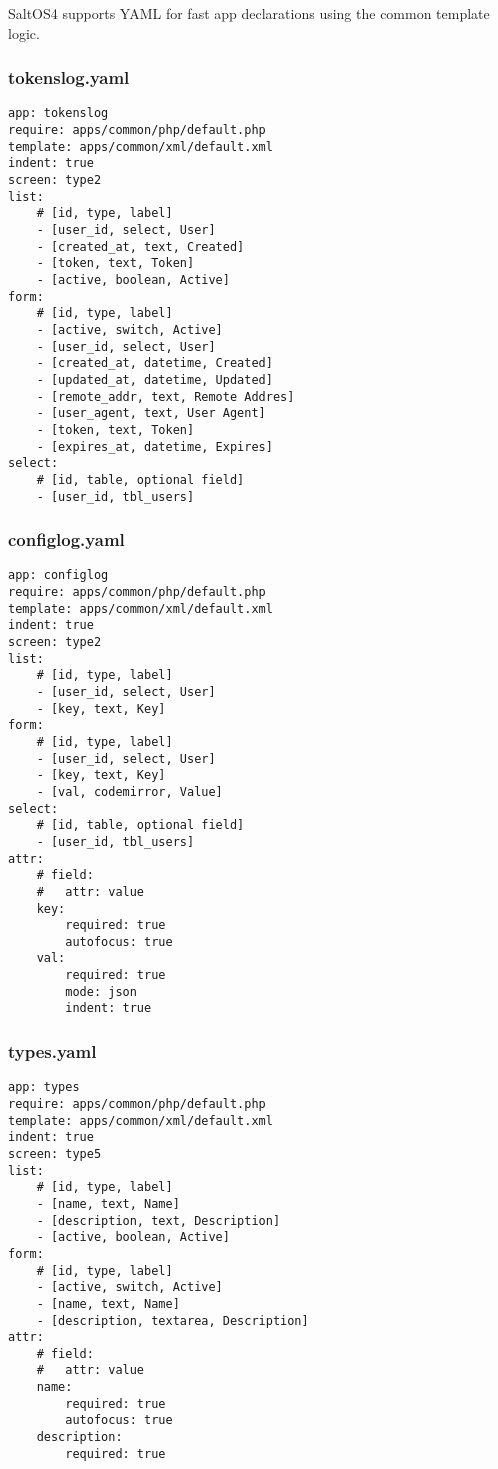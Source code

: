 \documentclass[a4paper]{article}
\begin{document}
SaltOS4 supports YAML for fast app declarations using the common template logic.

\hypertarget{toc15}{}
\subsubsection{tokenslog.yaml}

\begin{lstlisting}
app: tokenslog
require: apps/common/php/default.php
template: apps/common/xml/default.xml
indent: true
screen: type2
list:
    # [id, type, label]
    - [user_id, select, User]
    - [created_at, text, Created]
    - [token, text, Token]
    - [active, boolean, Active]
form:
    # [id, type, label]
    - [active, switch, Active]
    - [user_id, select, User]
    - [created_at, datetime, Created]
    - [updated_at, datetime, Updated]
    - [remote_addr, text, Remote Addres]
    - [user_agent, text, User Agent]
    - [token, text, Token]
    - [expires_at, datetime, Expires]
select:
    # [id, table, optional field]
    - [user_id, tbl_users]
\end{lstlisting}

\hypertarget{toc16}{}
\subsubsection{configlog.yaml}

\begin{lstlisting}
app: configlog
require: apps/common/php/default.php
template: apps/common/xml/default.xml
indent: true
screen: type2
list:
    # [id, type, label]
    - [user_id, select, User]
    - [key, text, Key]
form:
    # [id, type, label]
    - [user_id, select, User]
    - [key, text, Key]
    - [val, codemirror, Value]
select:
    # [id, table, optional field]
    - [user_id, tbl_users]
attr:
    # field:
    #   attr: value
    key:
        required: true
        autofocus: true
    val:
        required: true
        mode: json
        indent: true
\end{lstlisting}

\hypertarget{toc17}{}
\subsubsection{types.yaml}

\begin{lstlisting}
app: types
require: apps/common/php/default.php
template: apps/common/xml/default.xml
indent: true
screen: type5
list:
    # [id, type, label]
    - [name, text, Name]
    - [description, text, Description]
    - [active, boolean, Active]
form:
    # [id, type, label]
    - [active, switch, Active]
    - [name, text, Name]
    - [description, textarea, Description]
attr:
    # field:
    #   attr: value
    name:
        required: true
        autofocus: true
    description:
        required: true
\end{lstlisting}
\end{document}
